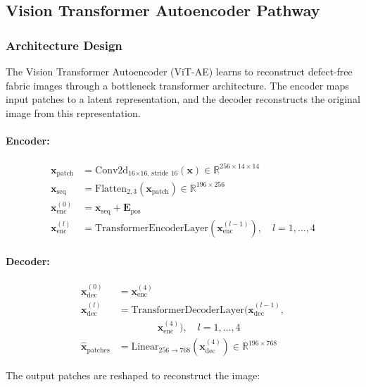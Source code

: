 \documentclass[journal]{IEEEtran}
\begin{document}
\subsection{Vision Transformer Autoencoder Pathway}
\label{sec:vae}

\subsubsection{Architecture Design}

The Vision Transformer Autoencoder (ViT-AE) learns to reconstruct defect-free fabric images through a bottleneck transformer architecture. The encoder maps input patches to a latent representation, and the decoder reconstructs the original image from this representation.

\paragraph{Encoder:}
\begin{align}
    \mathbf{x}_{\text{patch}} &= \text{Conv2d}_{\text{16$\times$16, stride 16}}(\mathbf{x}) \in \mathbb{R}^{256 \times 14 \times 14} \\
    \mathbf{x}_{\text{seq}} &= \text{Flatten}_{2,3}(\mathbf{x}_{\text{patch}}) \in \mathbb{R}^{196 \times 256} \\
    \mathbf{x}_{\text{enc}}^{(0)} &= \mathbf{x}_{\text{seq}} + \mathbf{E}_{\text{pos}} \\
    \mathbf{x}_{\text{enc}}^{(l)} &= \text{TransformerEncoderLayer}(\mathbf{x}_{\text{enc}}^{(l-1)}), \quad l = 1,\ldots,4
\end{align}

\paragraph{Decoder:}
\begin{align}
    \mathbf{x}_{\text{dec}}^{(0)} &= \mathbf{x}_{\text{enc}}^{(4)} \\
    \mathbf{x}_{\text{dec}}^{(l)} &= \text{TransformerDecoderLayer}(\mathbf{x}_{\text{dec}}^{(l-1)},\nonumber\\
    &\qquad\qquad \mathbf{x}_{\text{enc}}^{(4)}), \quad l = 1,\ldots,4 \\
    \hat{\mathbf{x}}_{\text{patches}} &= \text{Linear}_{256 \rightarrow 768}(\mathbf{x}_{\text{dec}}^{(4)}) \in \mathbb{R}^{196 \times 768}
\end{align}

The output patches are reshaped to reconstruct the image:
\end{document}
